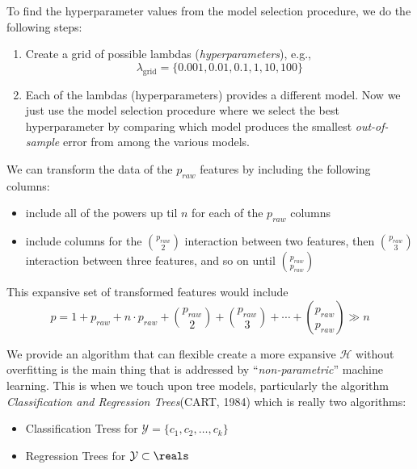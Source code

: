 \documentclass[12pt]{article}
\begin{document}
\begin{enumerate}
\begin{tcolorbox}[colback=white, sharp corners]
To find the hyperparameter values from the model selection procedure, we do the following steps:
\begin{enumerate}
\item[\#1:] Create a grid of possible lambdas (\emph{hyperparameters}), e.g., 
\[
	\lambda_{\text{grid}} = \lbrace 0.001, 0.01, 0.1, 1, 10, 100 \rbrace
\]
\item[\#2:] Each of the lambdas (hyperparameters) provides a different model. Now we just use the model selection procedure where we select the best hyperparameter by comparing which model produces the smallest \emph{out-of-sample} error from among the various models. 
\end{enumerate}
\end{tcolorbox}

\newpage

\begin{tcolorbox}[colback=white, sharp corners]
We can transform the data of the $p_{raw}$ features by including the following columns:
\begin{itemize}
\item include all of the powers up til $n$ for each of the $p_{raw}$ columns
\item include columns for the $\binom{p_{raw}}{2}$ interaction between two features, then $\binom{p_{raw}}{3}$ interaction between three features, and so on until $\binom{p_{raw}}{p_{raw}}$
\end{itemize}
This expansive set of transformed features would include
\[
	p = 1 + p_{raw} + n \cdot p_{raw} + \binom{p_{raw}}{2} + \binom{p_{raw}}{3} +  \cdots + \binom{p_{raw}}{p_{raw}} \gg n
\]
\end{tcolorbox}


\begin{tcolorbox}[colback=white, sharp corners]
We provide an algorithm that can flexible create a more expansive $\mathcal{H}$ without overfitting is the main thing that is addressed by ``\emph{non-parametric}'' machine learning. This is when we touch upon tree models, particularly the algorithm \emph{Classification and Regression Trees}(CART, 1984) which is really two algorithms: 
\begin{itemize}
\item Classification Tress for $\mathcal{Y} = \lbrace c_1, c_2, \ldots, c_k \rbrace$
\item Regression Trees for $\mathcal{Y} \subset \reals$
\end{itemize}
\end{tcolorbox}



\end{enumerate}
\end{document}
